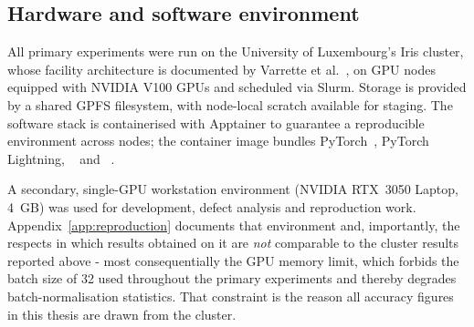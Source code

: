 \subsection{Hardware and software environment}

All primary experiments were run on the University of Luxembourg's Iris cluster,
whose facility architecture is documented by Varrette et al.~\cite{Varrette22},
on GPU nodes equipped with NVIDIA V100 GPUs and scheduled via Slurm.
Storage is provided by a shared GPFS filesystem, with node-local scratch available
for staging.
The software stack is containerised with Apptainer to guarantee a reproducible
environment across nodes; the container image bundles PyTorch~\cite{Paszke19},
PyTorch Lightning, ~\cite{Iakubovskii19} and
~\cite{Buslaev20}.

A secondary, single-GPU workstation environment (NVIDIA RTX~3050 Laptop, 4~GB) was
used for development, defect analysis and reproduction work.
Appendix~\ref{app:reproduction} documents that environment and, importantly, the
respects in which results obtained on it are \emph{not} comparable to the cluster
results reported above - most consequentially the GPU memory limit, which
forbids the batch size of 32 used throughout the primary experiments and thereby
degrades batch-normalisation statistics.
That constraint is the reason all accuracy figures in this thesis are drawn from the
cluster.
